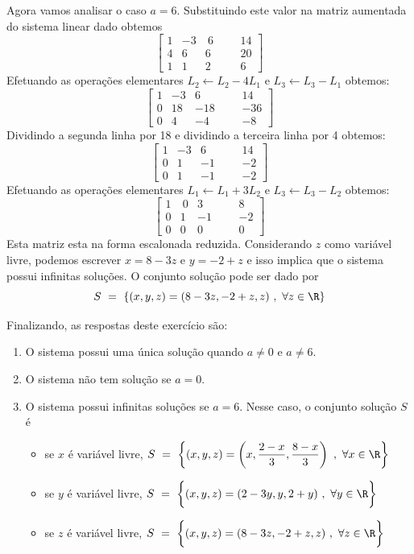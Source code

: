 \begin{solution}
\medskip
Agora vamos analisar o caso $a=6$. Substituindo este valor na matriz aumentada do sistema linear dado obtemos
$$ \left[\begin{array}{rrrr|rr}
  1 & -3 & \ 6 & & &  14  \\
  4 &  6 &   6 & & &  20  \\ 
  1 &  1 &   2 & & &   6  \end{array}\right] $$
Efetuando as operações elementares $L_2 \leftarrow L_2 - 4L_1$ e $L_3 \leftarrow L_3 - L_1$ obtemos:
$$ \left[\begin{array}{rrrr|rr}
  1 & -3 &   6 & & &   14  \\
  0 & 18 & -18 & & &  -36  \\ 
  0 &  4 &  -4 & & &   -8  \end{array}\right] $$
Dividindo a segunda linha por 18 e dividindo a terceira linha por 4 obtemos:
$$ \left[\begin{array}{rrrr|rr}
  1 & -3 &  6 & & &   14  \\
  0 &  1 & -1 & & &   -2  \\ 
  0 &  1 & -1 & & &   -2  \end{array}\right] $$
Efetuando as operações elementares $L_1 \leftarrow L_1 + 3L_2$ e $L_3 \leftarrow L_3 - L_2$ obtemos:
$$ \left[\begin{array}{rrrr|rr}
  1 & \ 0 &  3 & & &   8  \\
  0 &   1 & -1 & & &  -2  \\ 
  0 &   0 &  0 & & &   0  \end{array}\right] $$
Esta matriz esta na forma escalonada reduzida. Considerando $z$ como variável livre, podemos escrever $x=8-3z$ e $y=-2+z$ e isso implica que o sistema possui infinitas soluções. O conjunto solução pode ser dado por
$$S\ =\ \{ (x,y,z) = (8-3z, -2+z , z)\ ,\ \forall z \in \R \} $$

\medskip
Finalizando, as respostas deste exercício são:
\begin{enumerate}
\item[(a)] O sistema possui uma única solução quando $a \neq 0$ e $a \neq 6$.
\item[(b)] O sistema não tem solução se $a=0$.
\item[(c)] O sistema possui infinitas soluções se $a=6$. Nesse caso, o conjunto solução $S$ é
\begin{itemize}
\item se $x$ é variável livre,
$S \displaystyle \ =\ \left\{ (x,y,z) = \left( x, \dfrac{2-x}{3} , \dfrac{8-x}{3}  \right)\ ,\ \forall x \in \R \right\} $
\item se $y$ é variável livre, $S\ =\ \biggl\{ (x,y,z) = ( 2-3y , y , 2+y )\ ,\ \forall y \in \R \biggr\} $
\item se $z$ é variável livre, $S\ =\ \biggl\{ (x,y,z) = (8-3z, -2+z , z)\ ,\ \forall z \in \R \biggr\} $
\end{itemize}
\end{enumerate}
\end{solution}


